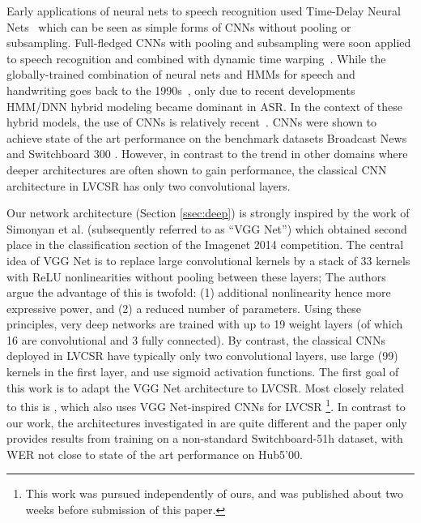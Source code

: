 \documentclass{article}
\begin{document}
Early applications of neural nets to speech recognition used Time-Delay Neural Nets~\cite{waibel1989phoneme} which
can be seen as simple forms of CNNs without pooling or subsampling. Full-fledged CNNs with pooling and
subsampling were soon applied to speech recognition and combined with dynamic time warping~\cite{bottou1989experiments,bottou1990speaker}.
While the globally-trained combination of neural nets and HMMs for speech and handwriting goes back to the 1990s~\cite{bengio1992global,lecun1998gradient},
only due to recent developments \cite{seide2011conversational, mohamed2011deep, kingsbury2009lattice}
HMM/DNN hybrid modeling became dominant in ASR.
In the context of these hybrid models, the use of CNNs is relatively recent~\cite{abdel2012applying}.
CNNs were shown to achieve state of the art performance on the benchmark datasets
Broadcast News and Switchboard 300 \cite{sainath2013deep}.
However, in contrast to the trend in other domains where deeper architectures
are often shown to gain performance,
the classical CNN architecture in LVCSR \cite{sainath2013deep, soltau2014joint, saon2015ibm} 
has only two convolutional layers.

Our network architecture (Section \ref{ssec:deep}) is strongly inspired by the
work of Simonyan et al. \cite{simonyan2014very} (subsequently referred to as ``VGG Net'') which obtained
second place in the classification section of the Imagenet 2014 competition.
The central idea of VGG Net is to replace large convolutional kernels by a stack of 33 kernels with ReLU nonlinearities
without pooling between these layers; 
The authors argue the advantage of this is twofold: (1) additional nonlinearity hence more expressive power, and (2) a reduced number of parameters.
Using these principles, very deep networks are trained with up to 19 weight layers (of which 16 are convolutional and 3 fully connected).
By contrast, the classical CNNs deployed in LVCSR have typically only two convolutional layers,
use large (99) kernels in the first layer, and use sigmoid activation functions.
The first goal of this work is to adapt the VGG Net architecture to LVCSR.
Most closely related to this is \cite{bi2015very}, which also uses VGG Net-inspired CNNs for LVCSR
\footnote{This work was pursued independently of ours, and was published about two weeks before submission of this paper.}.
In contrast to our work, the architectures investigated in \cite{bi2015very} are quite different
and the paper only provides results from training on a non-standard Switchboard-51h dataset,
with WER not close to state of the art performance on Hub5'00.
\end{document}
